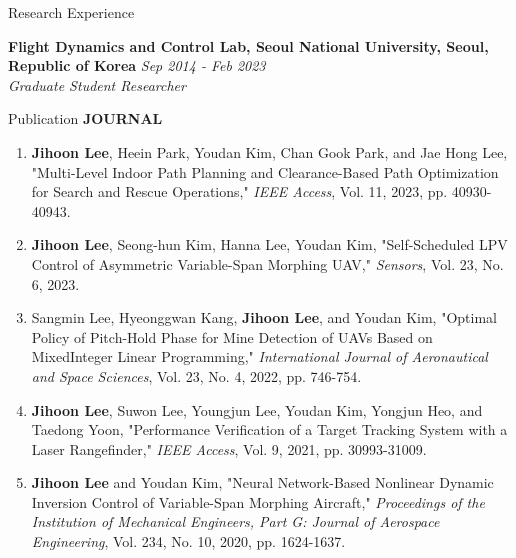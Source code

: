 \documentclass{resume}
\begin{document}
\begin{rSection}{Research Experience}\normalfont

{\bf Flight Dynamics and Control Lab, Seoul National University, Seoul, Republic of Korea} \hfill {\em Sep 2014 - Feb 2023} 
\\{\textit{Graduate Student Researcher}}

\end{rSection}

\begin{rSection}{Publication}\normalfont
	\textbf{JOURNAL}
	\begin{enumerate}\renewcommand{\labelenumi}{[J\theenumi]}

		\item \textbf{\color{coolblack}Jihoon Lee}, Heein Park, Youdan Kim, Chan Gook Park, and Jae Hong Lee, "Multi-Level Indoor Path Planning and Clearance-Based Path Optimization for Search and Rescue Operations," \textit{IEEE Access}, Vol. 11, 2023, pp. 40930-40943.

		\item \textbf{\color{coolblack}Jihoon Lee}, Seong-hun Kim, Hanna Lee, Youdan Kim, "Self-Scheduled LPV Control of Asymmetric Variable-Span Morphing UAV," \textit{Sensors}, Vol. 23, No. 6, 2023.
		
		\item Sangmin Lee, Hyeonggwan Kang, \textbf{\color{coolblack}Jihoon Lee}, and Youdan Kim, "Optimal Policy of Pitch-Hold Phase for Mine Detection of UAVs Based on MixedInteger Linear Programming," \textit{International Journal of Aeronautical and Space Sciences}, Vol. 23, No. 4, 2022, pp. 746-754.
		
		\item \textbf{\color{coolblack}Jihoon Lee}, Suwon Lee, Youngjun Lee, Youdan Kim, Yongjun Heo, and Taedong Yoon, "Performance Veriﬁcation of a Target Tracking System with a Laser Rangeﬁnder," \textit{IEEE Access}, Vol. 9, 2021, pp. 30993-31009.
		
		\item \textbf{\color{coolblack}Jihoon Lee} and Youdan Kim, "Neural Network-Based Nonlinear Dynamic Inversion Control of Variable-Span Morphing Aircraft," \textit{Proceedings of the Institution of Mechanical Engineers, Part G: Journal of Aerospace Engineering}, Vol. 234, No. 10, 2020, pp. 1624-1637. 
		

\end{enumerate}
\end{rSection}
\end{document}
